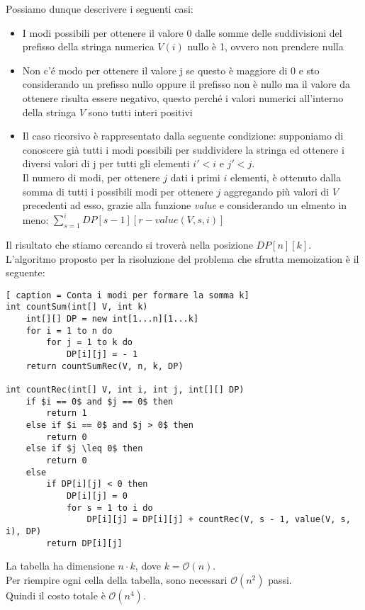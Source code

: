 \documentclass[../cheatSheetAlgoritmi.tex]{subfiles}
\begin{document}
Possiamo dunque descrivere i seguenti casi: 
\begin{itemize}
		\item I modi possibili per ottenere il valore 0 dalle somme delle suddivisioni del prefisso della stringa numerica $V(i)$ nullo è 1, ovvero non prendere nulla
		\item Non c'é modo per ottenere il valore j se questo è maggiore di 0 e sto considerando un prefisso nullo oppure il prefisso non è nullo ma il valore da ottenere risulta essere negativo, questo perché i valori numerici all'interno della stringa $V$ sono tutti interi positivi
		\item Il caso ricorsivo è rappresentato dalla seguente condizione: supponiamo di conoscere già tutti i modi possibili per suddividere la stringa ed ottenere i diversi valori di j per tutti gli elementi $i' < i$ e $j' < j$. \\ Il numero di modi, per ottenere $j$ dati i primi $i$ elementi, è ottenuto dalla somma di tutti i possibili modi per ottenere $j$ aggregando più valori di $V$ precedenti ad esso, grazie alla funzione \emph{value} e considerando un elmento in meno: $\sum_{s = 1}^{i} DP[s - 1][r - value(V, s, i)]$
\end{itemize}
Il risultato che stiamo cercando si troverà nella posizione $DP[n][k]$. \\
L'algoritmo proposto per la risoluzione del problema che sfrutta memoization è il seguente:
\newpage
\begin{lstlisting}[ caption = Conta i modi per formare la somma k]
int countSum(int[] V, int k)
	int[][] DP = new int[1...n][1...k]
	for i = 1 to n do
		for j = 1 to k do
			DP[i][j] = - 1
	return countSumRec(V, n, k, DP)

int countRec(int[] V, int i, int j, int[][] DP)
	if $i == 0$ and $j == 0$ then
		return 1
	else if $i == 0$ and $j > 0$ then
		return 0
	else if $j \leq 0$ then
		return 0
	else 
		if DP[i][j] < 0 then
			DP[i][j] = 0
			for s = 1 to i do
				DP[i][j] = DP[i][j] + countRec(V, s - 1, value(V, s, i), DP)
		return DP[i][j]
\end{lstlisting}
La tabella ha dimensione $n \cdot k$, dove $k = \mathcal{O}(n)$. \\ 
Per riempire ogni cella della tabella, sono necessari $\mathcal{O}(n^2)$ passi. \\ Quindi il costo totale è $\mathcal{O}(n^4)$. 
\end{document}
